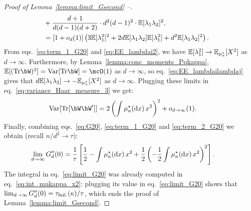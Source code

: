 \begin{proof}[Proof of Lemma~\ref{lemma:limit_Gsecond} --]
\begin{align}
    \nonumber
   &+ \frac{d+1}{d(d-1)(d+2)} \cdot d^2(d-1)^2 \cdot \mathbb{E}[\lambda_1 \lambda_2]^2, \\ 
   &= [1 +o_d(1)] \left(3\mathbb{E}[\lambda_1^2]^2 + 2d \mathbb{E}[\lambda_1 \lambda_2] \mathbb{E}[\lambda_1^2] + d^2 \mathbb{E}[\lambda_1 \lambda_2]^2 \right).
\end{align}
From eqs.~\eqref{eq:term_1_G20} and \eqref{eq:EE_lambdai2}, we have $\mathbb{E}[\lambda_1^2] \to \mathbb{E}_{\mu_\kappa^\star}[X^2]$ as $d \to \infty$.
Furthermore, by Lemma~\ref{lemma:conc_moments_Pqkappa}, $\EE[(\Tr \bW)^2] = \Var[\Tr \bW] = \mcO(1)$ as $d \to \infty$, 
so eq.~\eqref{eq:EE_lambdailambdaj} gives that $d \mathbb{E}[\lambda_1 \lambda_2] \to - \mathbb{E}_{\mu_\kappa^\star}[X^2]$ as $d \to \infty$.
Plugging these limits in eq.~\eqref{eq:variance_Haar_measure_3} we get:
\begin{align}\label{eq:term_2_G20}
   \textrm{Var}[\Tr[\bW \bW']] &= 2 \left(\int \mu_\kappa^\star(\rd x) \, x^2 \right)^2 + \smallO_{d\to \infty}(1).
\end{align}
Finally, combining eqs.~\eqref{eq:G20}, \eqref{eq:term_1_G20} and \eqref{eq:term_2_G20} we obtain (recall $n/d^2 \to \tau$):
\begin{align}\label{eq:limit_G20}
    \lim_{d \to \infty} G_d''(0) &= \frac{1}{\tau} \left[\frac{1}{2} - \int \mu_\kappa^\star(\mathrm{d} x) \, x^2 + \frac{1}{2}\left(- \frac{1}{2} \int \mu_\kappa^\star(\mathrm{d} x) \, x^2\right)^2 \right].
\end{align}
The integral in eq.~\eqref{eq:limit_G20} was already computed in eq.~\eqref{eq:int_mukappa_x2}: plugging its value in eq.~\eqref{eq:limit_G20} 
shows that $  \lim_{d \to \infty} G_d''(0) = \tau_{\rm fail.}(\kappa)/\tau$, which ends the proof of Lemma~\ref{lemma:limit_Gsecond}.
\end{proof}